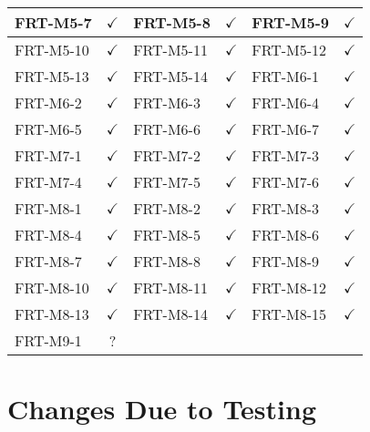 \documentclass[12pt, titlepage]{article}
\begin{document}
\begin{longtable}{|l|c|l|c|l|c|}
	\midrule
	FRT-M5-7         & $\checkmark$    & FRT-M5-8         & $\checkmark$    & FRT-M5-9         & $\checkmark$    \\
	\midrule
	FRT-M5-10        & $\checkmark$    & FRT-M5-11        & $\checkmark$    & FRT-M5-12        & $\checkmark$    \\
	\midrule
	FRT-M5-13        & $\checkmark$    & FRT-M5-14        & $\checkmark$    & FRT-M6-1         & $\checkmark$    \\
	\midrule
	FRT-M6-2         & $\checkmark$    & FRT-M6-3         & $\checkmark$    & FRT-M6-4         & $\checkmark$    \\
	\midrule
	FRT-M6-5         & $\checkmark$    & FRT-M6-6         & $\checkmark$    & FRT-M6-7         & $\checkmark$    \\
	\midrule
	FRT-M7-1         & $\checkmark$    & FRT-M7-2         & $\checkmark$    & FRT-M7-3         & $\checkmark$    \\
	\midrule
	FRT-M7-4         & $\checkmark$    & FRT-M7-5         & $\checkmark$    & FRT-M7-6         & $\checkmark$    \\
	\midrule
	FRT-M8-1         & $\checkmark$    & FRT-M8-2         & $\checkmark$    & FRT-M8-3         & $\checkmark$    \\
	\midrule
	FRT-M8-4         & $\checkmark$    & FRT-M8-5         & $\checkmark$    & FRT-M8-6         & $\checkmark$    \\
	\midrule
	FRT-M8-7         & $\checkmark$    & FRT-M8-8         & $\checkmark$    & FRT-M8-9         & $\checkmark$    \\
	\midrule
	FRT-M8-10        & $\checkmark$    & FRT-M8-11        & $\checkmark$    & FRT-M8-12        & $\checkmark$    \\
	\midrule
	FRT-M8-13        & $\checkmark$    & FRT-M8-14        & $\checkmark$    & FRT-M8-15        & $\checkmark$    \\
	\midrule
	FRT-M9-1         & ?               & ~                & ~               & ~                & ~               \\
	\bottomrule
\end{longtable}

\newpage

\section{Changes Due to Testing}

\end{document}
